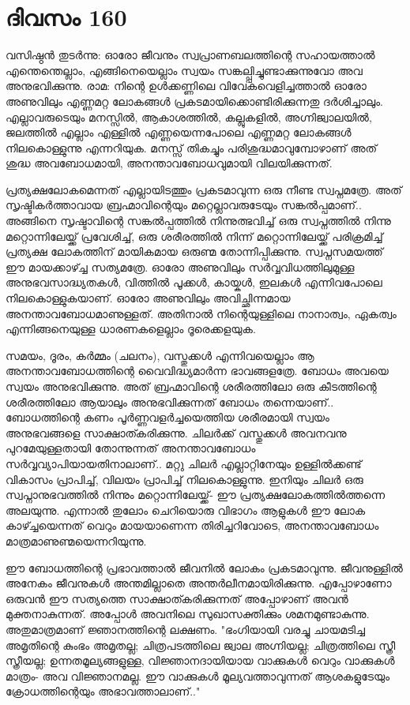 \section{ദിവസം 160}


വസിഷ്ഠൻ തുടർന്നു: ഓരോ ജീവനും സ്വപ്രാണബലത്തിന്റെ സഹായത്താൽ എന്തെന്തെല്ലാം, എങ്ങിനെയെല്ലാം സ്വയം സങ്കല്പ്പിച്ചുണ്ടാക്കുന്നുവോ അവ അനുഭവിക്കുന്നു. രാമ: നിന്റെ ഉൾക്കണ്ണിലെ വിവേകവെളിച്ചത്താൽ ഓരോ അണുവിലും എണ്ണമറ്റ ലോകങ്ങൾ പ്രകടമായിക്കൊണ്ടിരിക്കുന്നതു ദർശിച്ചാലും. എല്ലാവരുടെയും മനസ്സിൽ, ആകാശത്തിൽ, കല്ലുകളിൽ, അഗ്നിജ്വാലയിൽ, ജലത്തിൽ എല്ലാം എള്ളിൽ എണ്ണയെന്നപോലെ എണ്ണമറ്റ ലോകങ്ങൾ നിലകൊള്ളുന്നു എന്നറിയുക. മനസ്സ് തികച്ചും പരിശുദ്ധമാവുമ്പോഴാണ്‌ അത് ശുദ്ധ അവബോധമായി, അനന്താവബോധവുമായി വിലയിക്കുന്നത്.

പ്രത്യക്ഷലോകമെന്നത് എല്ലായിടത്തും പ്രകടമാവുന്ന ഒരു നീണ്ട സ്വപ്നമത്രേ. അത് സൃഷ്ടികർത്താവായ ബ്രഹ്മാവിന്റെയും മറ്റെല്ലാവരുടേയും സങ്കൽപ്പമാണ്‌.. അങ്ങിനെ സൃഷ്ടാവിന്റെ സങ്കൽപ്പത്തിൽ നിന്നുത്ഭവിച്ച് ഒരു സ്വപ്നത്തിൽ നിന്നു മറ്റൊന്നിലേയ്ക്ക് പ്രവേശിച്ച്, ഒരു ശരീരത്തിൽ നിന്ന് മറ്റൊന്നിലേയ്ക്ക് പരിക്രമിച്ച് പ്രത്യക്ഷ ലോകത്തിന്‌ മായികമായ ഒരുണ്മ തോന്നിപ്പിക്കുന്നു. സ്വപ്നസമയത്ത് ഈ മായക്കാഴ്ച്ച സത്യമത്രേ. ഓരോ അണുവിലും സർവ്വവിധത്തിലുമുള്ള അനുഭവസാദ്ധ്യതകൾ, വിത്തിൽ പൂക്കൾ, കായ്കൾ, ഇലകൾ എന്നിവപോലെ നിലകൊള്ളുകയാണ്‌. ഓരോ അണുവിലും അവിച്ഛിന്നമായ അനന്താവബോധമാണുള്ളത്. അതിനാൽ നിന്റെയുള്ളിലെ നാനാത്വം, ഏകത്വം എന്നിങ്ങനെയുള്ള ധാരണകളെല്ലാം ദൂരെക്കളയുക.

സമയം, ദൂരം, കർമ്മം (ചലനം), വസ്തുക്കൾ എന്നിവയെല്ലാം ആ അനന്താവബോധത്തിന്റെ വൈവിദ്ധ്യമാർന്ന ഭാവങ്ങളത്രേ. ബോധം അവയെ സ്വയം അനുഭവിക്കുന്നു. അത് ബ്രഹ്മാവിന്റെ ശരീരത്തിലോ ഒരു കീടത്തിന്റെ ശരീരത്തിലോ ആയാലും അനുഭവിക്കുന്നത് ബോധം തന്നെയാണ്‌.. ബോധത്തിന്റെ കണം പൂർണ്ണവളർച്ചയെത്തിയ ശരീരമായി സ്വയം അനുഭവങ്ങളെ സാക്ഷാത്കരിക്കുന്നു. ചിലർക്ക് വസ്തുക്കൾ അവനവനു പുറമേയുള്ളതായി തോന്നുന്നത് അനന്താവബോധം സർവ്വവ്യാപിയായതിനാലാണ്‌.. മറ്റു ചിലർ എല്ലാറ്റിനേയും ഉള്ളിൽക്കണ്ട് വികാസം പ്രാപിച്ച്, വിലയം പ്രാപിച്ച് നിലകൊള്ളുന്നു. ഇനിയും ചിലർ ഒരു സ്വപ്നാനുഭവത്തിൽ നിന്നും മറ്റൊന്നിലേയ്ക്ക്- ഈ പ്രത്യക്ഷലോകത്തിൽത്തന്നെ അലയുന്നു. എന്നാൽ തുലോം ചെറിയൊരു വിഭാഗം ആളുകൾ ഈ ലോക കാഴ്ച്ചയെന്നത് വെറും മായയാണെന്ന തിരിച്ചറിവോടെ, അനന്താവബോധം മാത്രമാണുണ്മയെന്നറിയുന്നു.

ഈ ബോധത്തിന്റെ പ്രഭാവത്താൽ ജീവനിൽ ലോകം പ്രകടമാവുന്നു. ജീവനുള്ളിൽ അനേകം ജീവനുകൾ അന്തമില്ലാതെ അന്തർലീനമായിരിക്കുന്നു. എപ്പോഴാണോ ഒരുവൻ ഈ സത്യത്തെ സാക്ഷാത്കരിക്കുന്നത് അപ്പോഴാണ്‌ അവൻ മുക്തനാകുന്നത്. അപ്പോൾ അവനിലെ സുഖാസക്തിക്കും ശമനമുണ്ടാകുന്നു. അതുമാത്രമാണ്‌ ജ്ഞാനത്തിന്റെ ലക്ഷണം. "ഭംഗിയായി വരച്ചു ചായമടിച്ച അമൃതിന്റെ കുംഭം അമൃതല്ല; ചിത്രപടത്തിലെ ജ്വാല അഗ്നിയല്ല; ചിത്രത്തിലെ സ്ത്രീ സ്ത്രീയല്ല; ഉന്നതമൂല്യങ്ങളുള്ള, വിജ്ഞാനദായിയായ വാക്കുകൾ വെറും വാക്കുകൾ മാത്രം- അവ വിജ്ഞാനമല്ല. ഈ വാക്കുകൾ മൂല്യവത്താവുന്നത് ആശകളുടേയും ക്രോധത്തിന്റെയും അഭാവത്താലാണ്‌.." 

